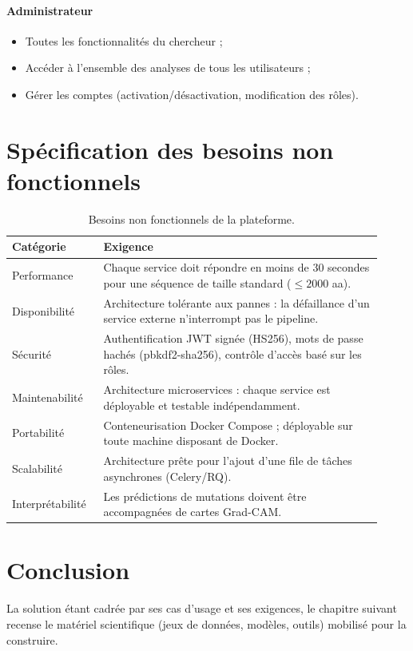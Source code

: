 \documentclass[12pt,a4paper,oneside]{book}
\begin{document}
\paragraph{Administrateur}
\begin{itemize}
  \item Toutes les fonctionnalités du chercheur ;
  \item Accéder à l'ensemble des analyses de tous les utilisateurs ;
  \item Gérer les comptes (activation/désactivation, modification des rôles).
\end{itemize}

\section{Spécification des besoins non fonctionnels}

\begin{table}[H]
\caption{Besoins non fonctionnels de la plateforme.}
\label{tab:nonfunc}
\centering
\renewcommand{\arraystretch}{1.3}
\begin{tabular}{L{0.22\linewidth} L{0.70\linewidth}}
\toprule
\textbf{Catégorie} & \textbf{Exigence} \\
\midrule
Performance      & Chaque service doit répondre en moins de 30 secondes pour une séquence de taille standard ($\leq 2000$ aa). \\
Disponibilité    & Architecture tolérante aux pannes : la défaillance d'un service externe n'interrompt pas le pipeline. \\
Sécurité         & Authentification JWT signée (HS256), mots de passe hachés (pbkdf2-sha256), contrôle d'accès basé sur les rôles. \\
Maintenabilité   & Architecture microservices : chaque service est déployable et testable indépendamment. \\
Portabilité      & Conteneurisation Docker Compose ; déployable sur toute machine disposant de Docker. \\
Scalabilité      & Architecture prête pour l'ajout d'une file de tâches asynchrones (Celery/RQ). \\
Interprétabilité & Les prédictions de mutations doivent être accompagnées de cartes Grad-CAM. \\
\bottomrule
\end{tabular}
\end{table}

\section*{Conclusion}
La solution étant cadrée par ses cas d'usage et ses exigences, le chapitre
suivant recense le matériel scientifique (jeux de données, modèles, outils)
mobilisé pour la construire.
\end{document}
